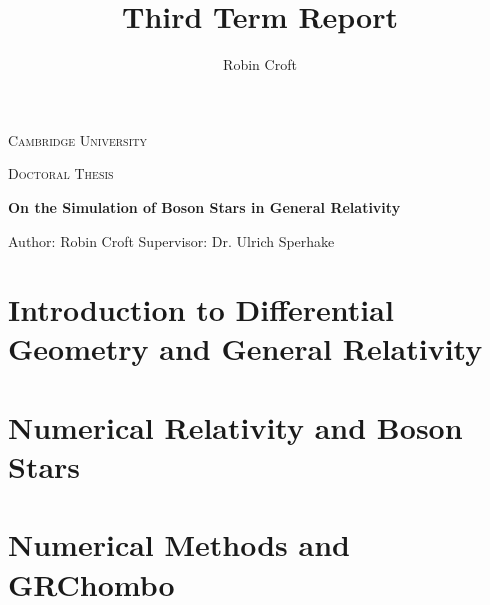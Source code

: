 \documentclass[11pt]{report}  %
\title{Third Term Report}
\author{Robin Croft}
\numberwithin{equation}{section}
\begin{document}
\begin{titlepage}
  \centering
  
  \centering
  {\scshape\LARGE Cambridge University \par}
  \vspace{1cm}
  {\scshape\Large Doctoral Thesis \par} 
    \vspace{2cm} 
    \hline
    \vspace{0.3cm}
  {\Large\itshape \par}
  {\huge\bfseries On the Simulation of Boson Stars in General Relativity\par} \vspace{0.3cm}
  \hline
  \vfill
   Author: Robin Croft
\vfill
  Supervisor: Dr. Ulrich Sperhake
  \vfill

    \begin{figure}[h!]
  \centering
\end{figure}


\end{titlepage}						%
\tableofcontents
\newpage
{}





\chapter{Introduction to Differential Geometry and General Relativity}












\chapter{Numerical Relativity and Boson Stars}






\chapter{Numerical Methods and GRChombo}



\end{document}
